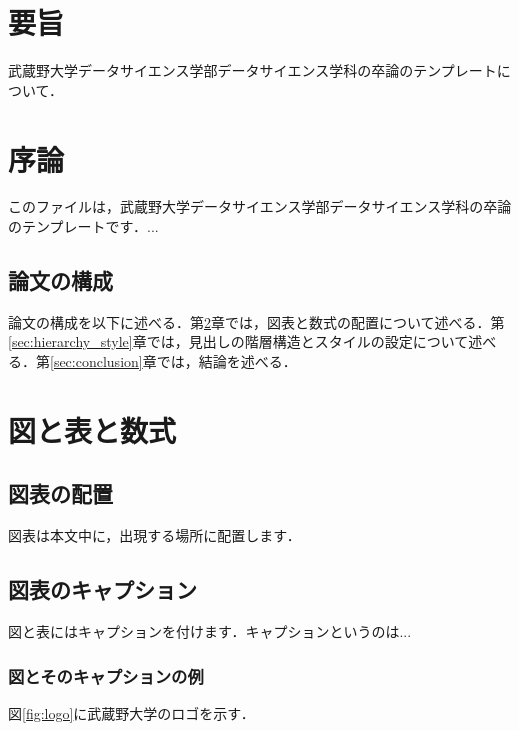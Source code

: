 \documentclass[titlepage,12pt]{ltjsarticle}
\title{卒業論文 \vskip\baselineskip タイトルタイトルタイトル}
\author{武蔵野太郎\\ データサイエンス学科\\ 武蔵野大学}
\date{2025年1月}
\begin{document}
\maketitle

\section*{要旨}
武蔵野大学データサイエンス学部データサイエンス学科の卒論のテンプレートについて．

\clearpage
\tableofcontents

\section{序論}\label{sec:introduction}
このファイルは，武蔵野大学データサイエンス学部データサイエンス学科の卒論のテンプレートです．...

\subsection{論文の構成}\label{subsec:structure}
論文の構成を以下に述べる．第\ref{sec:figures_tables_equations}章では，図表と数式の配置について述べる．第\ref{sec:hierarchy_style}章では，見出しの階層構造とスタイルの設定について述べる．第\ref{sec:conclusion}章では，結論を述べる．

\section{図と表と数式}\label{sec:figures_tables_equations}
\subsection{図表の配置}\label{subsec:placement}
図表は本文中に，出現する場所に配置します．

\subsection{図表のキャプション}\label{subsec:caption}
図と表にはキャプションを付けます．キャプションというのは...

\subsubsection{図とそのキャプションの例}\label{subsubsec:figure}
図\ref{fig:logo}に武蔵野大学のロゴを示す．
\end{document}
